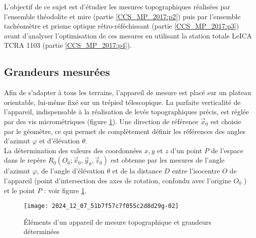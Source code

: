 \begin{obj}
L'objectif de ce sujet est d'étudier les mesures topographiques réalisées par l'ensemble théodolite et mire (partie \ref{CCS_MP_2017:p2}) puis par l'ensemble tachéomètre et prisme optique rétro-réféchissant (partie \ref{CCS_MP_2017:p3}) avant d'analyser l'optimisation de ces mesures en utilisant la station totale LeICA TCRA 1103 (partie \ref{CCS_MP_2017:p4}).
\end{obj}
\fi

\subsection{Grandeurs mesurées}

\ifprof
\else
Afin de s'adapter à tous les terrains, l'appareil de mesure est placé sur un plateau orientable, lui-même fixé sur un trépied télescopique. La parfaite verticalité de l'appareil, indispensable à la réalisation de levés topographiques précis, est réglée par des vis micrométriques (figure \ref{CCS_MP_2017:fig_02}). Une direction de référence $\vec{x}_{0}$ est choisie par le géomètre, ce qui permet de complètement définir les références des angles d'azimut $\varphi$ et d'élévation $\theta$.\\
La détermination des valeurs des coordonnées $x, y$ et $z$ d'un point $P$ de l'espace dans le repère $R_{0}\left(O_{0} ; \vec{x}_{0}, \vec{y}_{0}, \vec{z}_{0}\right)$ est obtenue par les mesures de l'angle d'azimut $\varphi$, de l'angle d'élévation $\theta$ et de la distance $D$ entre l'isocentre $O$ de l'appareil (point d'intersection des axes de rotation, confondu avec l'origine $O_{0}$ ) et le point $P$ : voir figure \ref{CCS_MP_2017:fig_02}.\\

\begin{figure}[!h]
\centering
\texttt{[image: 2024\_12\_07\_51b7f57c7f055c2d8d29g-02]}

\caption{Éléments d'un appareil de mesure topographique et grandeurs déterminées \label{CCS_MP_2017:fig_02}}
\end{figure}
\fi


